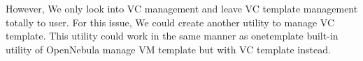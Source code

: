 \documentclass[conference]{IEEEtran}
\begin{document}
However, We only look into VC management and leave VC template management totally to user.
For this issue, We could create another utility to manage VC template.
This utility could work in the same manner as onetemplate built-in utility of OpenNebula manage VM template but with VC template instead.












%
%
%
%




\end{document}
